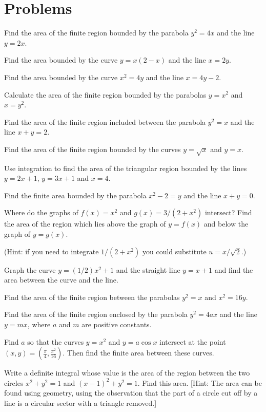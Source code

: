 \section{Problems} %
\problemfont %
\begin{multicols}{2}\setlength{\parindent}{0pt}
\problem Find the area of the finite region bounded by the parabola $y^2=4x$ and %
the line $y=2x$.

\problem Find the area bounded by the curve $y=x(2-x)$ and the line $x=2y$. %

\problem Find the area bounded by the curve $x^2=4y$ and the line $x=4y-2$. %

\problem Calculate the area of the finite region bounded by the parabolas $y=x^2$ %
and $x=y^2$.

\problem Find the area of the finite region included between the parabola $y^2=x$ %
and the line $x+y=2$.

\problem Find the area of the finite region bounded by the curves $y=\sqrt{x}$ and %
$y=x$.

\problem Use integration to find the area of the triangular region bounded %
by the lines $y=2x+1$, $y=3x+1$ and $x=4$.


\problem Find the finite area bounded by the parabola $x^2-2=y$ and the line %
$x+y=0$.

\problem Where do the graphs of $f(x) = x^2$ and $g(x) = 3/(2+x^2)$ %
intersect?  Find the area of the region which lies above the graph of $y=f(x)$
and below the graph of $y=g(x)$.

(Hint: if you need to integrate $1/(2+x^2)$ you could substitute
$u=x/ \sqrt2$.)

\problem Graph the curve $y=(1/2)x^2+1$ and the straight line $y=x+1$ and %
find the area between the curve and the line.

\problem Find the area of the finite region between the parabolas $y^2=x$ and %
$x^2=16y$.

\problem Find the area of the finite region enclosed by the parabola $y^2=4ax$ and %
the line $y=mx$, where $a$ and $m$ are positive constants.

\problem Find $a$ so that the curves $y=x^2$ and $y=a\cos x$ intersect at %
the point $(x,y)=(\frac\pi4, \frac{\pi^2}{16})$. Then find the finite area
between these curves.

\problem \groupproblem Write a definite integral whose value is the %
area of the region between the two circles $x^2+y^2=1$ and
$(x-1)^2+y^2=1$.  Find this area.  [Hint: The area can be found using geometry,
using the observation that the part of a circle cut off by a line is a circular
sector with a triangle removed.]

\end{multicols}
\noproblemfont
